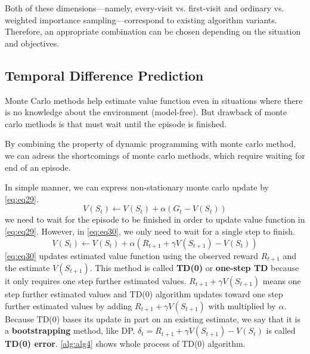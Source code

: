 \documentclass[
	10pt, %
]{article}
\theoremstyle{plain}
\newcommand{\tb}[1]{\textbf{#1}}
\numberwithin{equation}{subsection} %
\begin{document}
Both of these dimensions—namely, every-visit vs. first-visit and ordinary vs. weighted importance sampling—correspond to existing algorithm variants. 
Therefore, an appropriate combination can be chosen depending on the situation and objectives.


\subsection{Temporal Difference Prediction}
Monte Carlo methods help estimate value function even in situations where there is no knowledge about the environment (model-free). But drawback of monte carlo methods is that must wait until the episode is finished.

By combining the property of dynamic programming with monte carlo method, we can adress the shortcomings of monte carlo methods, which require waiting for end of an episode.

In simple manner, we can express non-stationary monte carlo update by \cref{eq:eq29}.
\begin{equation} \label{eq:eq29}
    V(S_t) \gets V(S_t) + \alpha (G_t - V(S_t))
\end{equation}
we need to wait for the episode to be finished in order to update value function in \cref{eq:eq29}. However, in \cref{eq:eq30}, we only need to wait for a single step to finish.
\begin{equation} \label{eq:eq30}
    V(S_t) \gets V(S_t) + \alpha (R_{t+1} + \gamma V(S_{t+1}) - V(S_t))
\end{equation}
\cref{eq:eq30} updates estimated value function using the observed reward $R_{t+1}$ and the estimate $V(S_{t+1})$. This method is called \tb{TD(0)} or \tb{one-step TD} because it only requires one step further estimated values. $R_{t+1} + \gamma V(S_{t+1})$ means one step further estimated values and TD(0) algorithm updates toward one step further estimated values by adding $R_{t+1}+\gamma V(S_{t+1})$ with multiplied by $\alpha$. Because TD(0) bases its update in part on an existing estimate, we say that it is a \tb{bootstrapping} method, like DP. $\delta_t = R_{t+1} + \gamma V(S_{t+1}) - V(S_t)$ is called \tb{TD(0) error}. \cref{alg:alg4} shows whole process of TD(0) algorithm.
\end{document}
